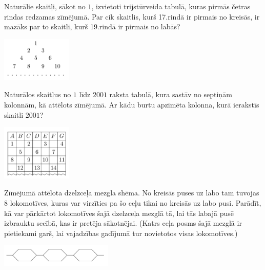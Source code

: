 \documentclass[11pt]{article}
\begin{document}
\begin{problem}[EE.PK.2001.8.TEST.5]
Naturālie skaitļi, sākot no $1$, izvietoti 
trijstūrveida tabulā, kuras pirmās četras rindas redzamas zīmējumā. 
Par cik skaitlis, kurš 17.rindā ir pirmais no kreisās, 
ir mazāks par to skaitli, kurš 19.rindā ir pirmais no labās?
\begin{center}
\includegraphics[width=0.25\textwidth]{math-induction-junior-classes/EE-PK-2001-8-TEST-5.png}
\end{center}
\end{problem}



\begin{problem}[EE.PK.2001.8.TEST.5]
Naturālos skaitļus no $1$ līdz $2001$ raksta tabulā, kura 
sastāv no septiņām kolonnām, kā attēlots zīmējumā. 
Ar kādu burtu apzīmēta kolonna, kurā ierakstīs skaitli $2001$?
\begin{center}
\includegraphics[width=0.25\textwidth]{math-induction-junior-classes/EE-PK-2001-9-TEST-5.png}
\end{center}
\end{problem}

\begin{problem}[EE.PK.2003.9.4]
Zīmējumā attēlota dzelzceļa mezgla shēma. No kreisās puses uz 
labo tam tuvojas $8$ lokomotīves, kuras var virzīties pa 
šo ceļu tikai no kreisās uz labo pusi. 
Parādīt, kā var pārkārtot lokomotīves šajā dzelzceļa mezglā tā, lai 
tās labajā pusē izbrauktu secībā, kas ir pretēja sākotnējai. 
(Katrs ceļa posms šajā mezglā ir pietiekami garš, lai vajadzības 
gadījumā tur novietotos visas lokomotīves.)
\begin{center}
\includegraphics[width=0.4\textwidth]{math-induction-junior-classes/EE-PK-2003-9-4.png}
\end{center}
\end{problem}
\end{document}
